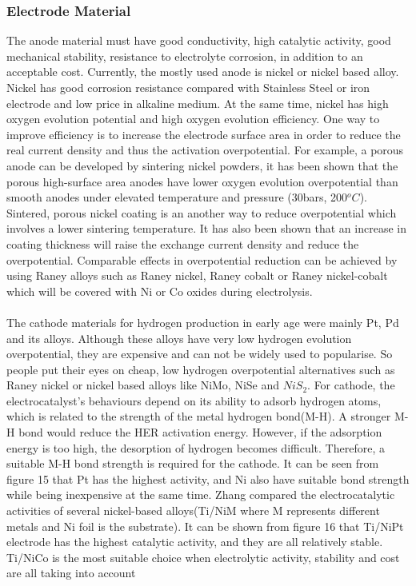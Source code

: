 \subsubsection{Electrode Material} 
The anode material must have good conductivity, high catalytic activity, good mechanical stability, resistance to electrolyte corrosion, in addition to an acceptable cost. Currently, the mostly used anode is nickel or nickel based alloy. Nickel has good corrosion resistance compared with Stainless Steel or iron electrode and low price in alkaline medium. At the same time, nickel has high oxygen evolution potential and high oxygen evolution efficiency. One way to improve efficiency is to increase the electrode surface area in order to reduce the real current density and thus the activation overpotential. For example, a porous anode can be developed by sintering nickel powders, it has been shown that the porous high-surface area anodes have lower oxygen evolution overpotential than smooth anodes under elevated temperature and pressure (30bars, 200$^oC$). Sintered, porous nickel coating is an another way to reduce overpotential which involves a lower sintering temperature. It has also been shown that an increase in coating thickness will raise the exchange current density and reduce the overpotential. Comparable effects in overpotential reduction can be achieved by using Raney alloys such as Raney nickel, Raney cobalt or Raney nickel-cobalt which will be covered with Ni or Co oxides during electrolysis.\cite{anode} \cite{anode2}\\ \\
The cathode materials for hydrogen production in early age were mainly Pt, Pd and its alloys. Although these alloys have very low hydrogen evolution overpotential, they are expensive and can not be widely used to popularise.  So people put their eyes on cheap, low hydrogen overpotential alternatives such as Raney nickel or nickel based alloys like NiMo, NiSe and $NiS_2$. For cathode, the electrocatalyst's behaviours depend on its ability to adsorb hydrogen atoms, which is related to the strength of the metal hydrogen bond(M-H). A stronger M-H bond would reduce the HER activation energy. However, if the adsorption energy is too high, the desorption of hydrogen becomes difficult. Therefore, a suitable M-H bond strength is required for the cathode. It can be seen from figure 15 that Pt has the highest activity, and Ni also have suitable bond strength while being inexpensive at the same time. \cite{cathode2} Zhang compared the electrocatalytic activities of several nickel-based alloys(Ti/NiM where M represents different metals and Ni foil is the substrate). It can be shown from figure 16 that Ti/NiPt electrode has the highest catalytic activity, and they are all relatively stable. Ti/NiCo is the most suitable choice when electrolytic activity, stability and cost are all taking into account\cite{cathode}
